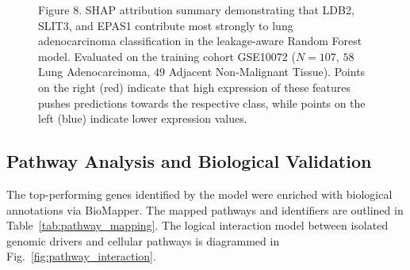 \documentclass[journal,10pt]{IEEEtran}
\begin{document}
\begin{figure}[htbp]
\caption{Figure 8. SHAP attribution summary demonstrating that LDB2, SLIT3, and EPAS1 contribute most strongly to lung adenocarcinoma classification in the leakage-aware Random Forest model. Evaluated on the training cohort GSE10072 ($N=107$, $58$ Lung Adenocarcinoma, $49$ Adjacent Non-Malignant Tissue). Points on the right (red) indicate that high expression of these features pushes predictions towards the respective class, while points on the left (blue) indicate lower expression values.}
\label{fig:shap_summary}
\end{figure}

\subsection{Pathway Analysis and Biological Validation}
The top-performing genes identified by the model were enriched with biological annotations via BioMapper. The mapped pathways and identifiers are outlined in Table~\ref{tab:pathway_mapping}. The logical interaction model between isolated genomic drivers and cellular pathways is diagrammed in Fig.~\ref{fig:pathway_interaction}.
\end{document}
